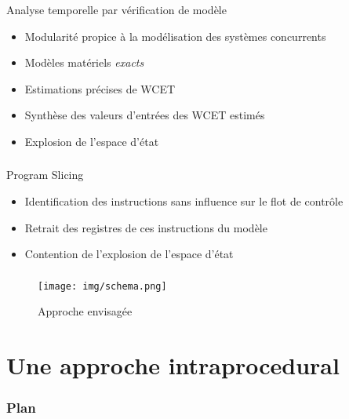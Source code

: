 \documentclass{beamer}
\begin{document}
      \begin{frame}
        \frametitle{\subsecname}

        Analyse temporelle par vérification de modèle
        \begin{itemize}
          \item Modularité propice à la modélisation des systèmes concurrents
          \item Modèles matériels \emph{exacts}
          \item Estimations précises de WCET
          \item Synthèse des valeurs d'entrées des WCET estimés
            \vspace{1em}\pause
          \item Explosion de l'espace d'état
        \end{itemize}
      \end{frame}

      \begin{frame}
        \frametitle{\subsecname}

        Program Slicing
        \begin{itemize}
          \item Identification des instructions sans influence sur le
            flot de contrôle
          \item Retrait des registres de ces instructions du modèle
          \item Contention de l'explosion de l'espace d'état
        \end{itemize}
      \end{frame}

      \begin{frame}
        \frametitle{\subsecname}

        \begin{figure}
          \centering
          \texttt{[image: img/schema.png]}
          \caption{Approche envisagée}
        \end{figure}        
      \end{frame}
    
  \section{Une approche intraprocedural}
    \begin{frame}
      \frametitle{Plan}
      \tableofcontents[currentsection]
    \end{frame}
    
\end{document}
